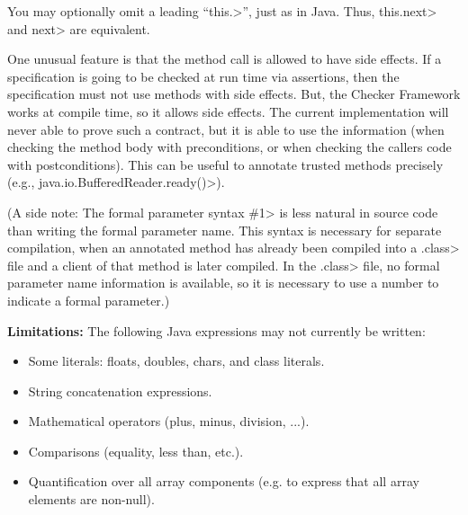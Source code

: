 You may optionally omit a leading ``\<this.>'', just as in Java.  Thus,
\<this.next> and \<next> are equivalent.

One unusual feature is that the method call is allowed to have side
effects.  If a specification is going to be checked at run time via
assertions, then the specification must not use methods with side
effects.  But, the Checker Framework works at compile time, so it allows
side effects.
The current implementation will never able to prove such
a contract, but it is able to use the information (when checking
the method body with preconditions, or when checking the callers
code with postconditions).  This can be useful to annotate trusted
methods precisely (e.g., \<java.io.BufferedReader.ready()>).


(A side note:  The formal parameter syntax \<\#1> is less natural in source code
than writing the formal parameter name.  This syntax is necessary for
separate compilation, when an annotated method has already been compiled
into a \<.class> file and a client of that method is later compiled.
In the \<.class> file, no formal parameter name information is available,
so it is necessary to use a number to indicate a formal parameter.)


\textbf{Limitations:}
The following Java expressions may not currently be written:
\begin{itemize}
\item Some literals:  floats, doubles, chars, and class literals.
\item String concatenation expressions.
\item Mathematical operators (plus, minus, division, ...).
\item Comparisons (equality, less than, etc.).
\item Quantification over all array components (e.g. to express that all
  array elements are non-null).
\end{itemize}



